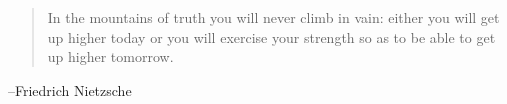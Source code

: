 \documentclass{exam}
\begin{document}
  \else
    \vspace{10 cm}
    \begin{quote}
      \begin{em}
        In the mountains of truth you will never climb in vain: either you will get up higher today or you will exercise your
        strength so as to be able to get up higher tomorrow.
      \end{em}
    \end{quote}
    \hspace{1 cm} --Friedrich Nietzsche
  \fi
\end{document}
